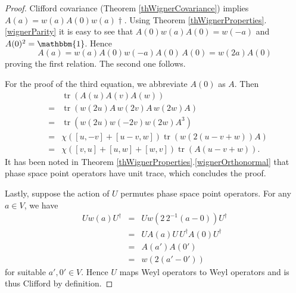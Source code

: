 \documentclass[aps,twocolumn,floatfix]{revtex4}
\def\Id{\mathbbm{1}}
\DeclareMathOperator{\tr}{tr}
\begin{document}
\begin{proof}
	Clifford covariance (Theorem \ref{thWignerCovariance}) implies
	$A(a)=w(a)A(0)w(a)\dagger$. 
	Using Theorem \ref{thWignerProperties}.\ref{wignerParity} it is 
	easy to see that $A(0)w(a)A(0)=w(-a)$ and $A(0)^2=\Id$. 
	Hence
	\begin{equation*}
		A(a)=w(a)A(0)w(-a)A(0)\,A(0)=w(2a)A(0)
	\end{equation*}
	proving the first relation. The second one follows.
		
	For the proof of the third equation, we abbreviate 
	$A(0)$ as $A$. Then
	\begin{eqnarray*}
		&&\tr\left(A(u) A(v) A(w)\right) \\
		&=&\tr(w(2u) A\, w(2v) A\, w(2w) A) \\
		&=&\tr(w(2u) w(-2v) w(2w) A^3) \\
		&=&\chi([u,-v]+[u-v,w]) \tr(w(2(u-v+w)) A) \\
		&=&\chi([v,u]+[u,w]+[w,v]) \tr(A(u-v+w)).
	\end{eqnarray*}
	It has been noted in Theorem
	\ref{thWignerProperties}.\ref{wignerOrthonormal} that phase space
	point operators have unit trace, which concludes the proof.

	Lastly, suppose the action of $U$ permutes phase space point
	operators. For any $a\in V$, we have
	\begin{eqnarray*}
		U w(a) U^\dagger 
		&=& U w(2 \, 2^{-1}(a-0)) U^\dagger \\
		&=& U A(a) U \, U^\dagger A(0) U^\dagger \\
		&=& A(a') A(0') \\
		&=& w(2(a'-0'))
	\end{eqnarray*}
	for suitable $a',0'\in V$. Hence $U$ maps Weyl operators to Weyl
	operators and is thus Clifford by definition.
\end{proof}
\end{document}
